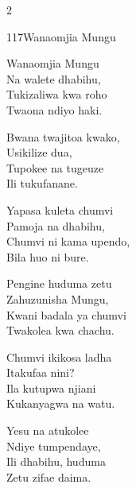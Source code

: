 \begin{multicols}{2}
\begin{hymn}{117}{Wanaomjia Mungu}{}
\begin{stanza}
Wanaomjia Mungu\\
Na walete dhabihu,\\
Tukizaliwa kwa roho\\
Twaona ndiyo haki.
\end{stanza}
\begin{chorus}
Bwana twajitoa kwako,\\
Usikilize dua,\\
Tupokee na tugeuze\\
Ili tukufanane.
\end{chorus}
\begin{stanza}
Yapasa kuleta chumvi\\
Pamoja na dhabihu,\\
Chumvi ni kama upendo,\\
Bila huo ni bure.
\end{stanza}
\begin{stanza}
Pengine huduma zetu\\
Zahuzunisha Mungu,\\
Kwani badala ya chumvi\\
Twakolea kwa chachu.
\end{stanza}
\begin{stanza}
Chumvi ikikosa ladha\\
Itakufaa nini?\\
Ila kutupwa njiani\\
Kukanyagwa na watu.
\end{stanza}
\begin{stanza}
Yesu na atukolee\\
Ndiye tumpendaye,\\
Ili dhabihu, huduma\\
Zetu zifae daima.
\end{stanza}
\end{hymn}


\end{multicols}
